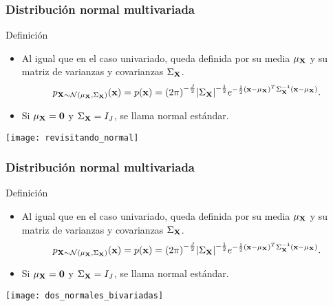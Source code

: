 \documentclass[table]{beamer}
\begin{document}
\begin{frame}
    \frametitle{Distribución normal multivariada}
    \begin{block}{Definición}
        \begin{itemize}
            \item Al igual que en el caso univariado, queda definida por su media $\mu_{\mathbf{X}}$ y su matriz de varianzas y covarianzas $\Sigma_{\mathbf{X}}$.
                \begin{equation*}
                    \ppdf{\Xvec \sim \normal{\mu_{\Xvec}}{\Sigma_{\Xvec}}}{\xvec} = \pdf{\xvec} = \parens{2 \pi}^{- \frac{J}{2}} \vparens{\Sigma_{\Xvec}}^{- \frac{1}{2}}
                    e^{- \frac{1}{2} \parens{\xvec - \mu_{\Xvec}}^{T} \Sigma_{\Xvec}^{-1} \parens{\xvec - \mu_{\Xvec}}} .
                \end{equation*}
            \item Si $\mu_{\mathbf{X}} = \mathbf{0}$ y $\Sigma_{\mathbf{X}} = I_{J}$, se llama normal estándar.
        \end{itemize}
    \end{block}
    \begin{center}
        \texttt{[image: revisitando\_normal]}
    \end{center}
\end{frame}

\begin{frame}
    \frametitle{Distribución normal multivariada}
    \begin{block}{Definición}
        \begin{itemize}
            \item Al igual que en el caso univariado, queda definida por su media $\mu_{\mathbf{X}}$ y su matriz de varianzas y covarianzas $\Sigma_{\mathbf{X}}$.
                \begin{equation*}
                    \ppdf{\Xvec \sim \normal{\mu_{\Xvec}}{\Sigma_{\Xvec}}}{\xvec} = \pdf{\xvec} = \parens{2 \pi}^{- \frac{J}{2}} \vparens{\Sigma_{\Xvec}}^{- \frac{1}{2}}
                    e^{- \frac{1}{2} \parens{\xvec - \mu_{\Xvec}}^{T} \Sigma_{\Xvec}^{-1} \parens{\xvec - \mu_{\Xvec}}} .
                \end{equation*}
            \item Si $\mu_{\mathbf{X}} = \mathbf{0}$ y $\Sigma_{\mathbf{X}} = I_{J}$, se llama normal estándar.
        \end{itemize}
    \end{block}
    \begin{center}
        \texttt{[image: dos\_normales\_bivariadas]}
    \end{center}
\end{frame}
\end{document}
